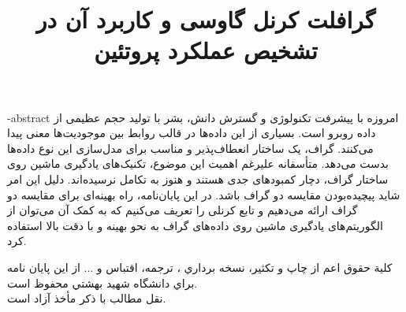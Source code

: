 \clearpage

\subject{علوم کامپیوتر }
\title{گرافلت کرنل‌ گاوسی و کاربرد آن در تشخیص عملکرد پروتئین}
\fa-abstract{\noindent
امروزه با پیشرفت تکنولوژی و گسترش دانش، بشر با تولید حجم عظیمی از داده روبرو است. بسیاری از این داده‌ها در قالب روابط بین موجودیت‌ها معنی پیدا می‌کنند. گراف، یک ساختار انعطاف‌پذیر و مناسب برای مدل‌سازی این نوع داده‌ها بدست می‌دهد. متأسفانه علیرغم اهمیت این موضوع، تکنیک‌های یادگیری ماشین روی ساختار گراف، دچار کمبود‌های جدی هستند و هنوز به تکامل نرسیده‌اند. دلیل این امر شاید پیچیده‌بودن مقایسه دو گراف باشد. در این پایان‌نامه، راه بهینه‌ای برای مقایسه دو گراف ارائه می‌دهیم و تابع کرنلی را تعریف می‌کنیم که به کمک آن می‌توان از الگوریتم‌های یادگیری ماشین روی داده‌های گراف به نحو بهینه و با دقت بالا استفاده کرد.
}
\newpage
\thispagestyle{empty}
\vtitle
\newpage
\thispagestyle{empty}
\clearpage
~~~
\newpage
\thispagestyle{empty}
\vspace*{5cm}
{\dav
\begin{center}
كلية حقوق اعم از چاپ و تكثير، نسخه برداري ، ترجمه، اقتباس و ... از اين پايان نامه براي دانشگاه شهيد بهشتي محفوظ است.\\
 نقل  مطالب با ذكر مأخذ آزاد است.
\end{center}
}
\newpage
\thispagestyle{empty}
\clearpage
~~~
\newpage

